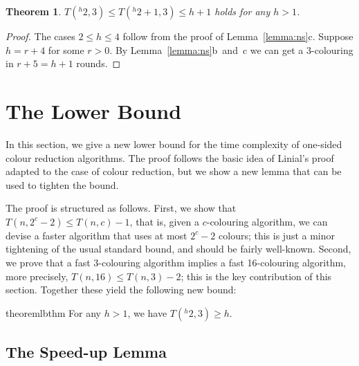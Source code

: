 \documentclass[a4paper,11pt]{article}
\newtheorem{theorem}{Theorem}
\theoremstyle{remark}
\newcommand{\pt}[1]{{}^{#1}2} \newcommand{\nh}{\sim} \DeclareMathOperator{\indeg}{in-deg}
\begin{document}
\begin{theorem}\label{thm:ub}
 $T(\pt{h},3) \le T(\pt{h}+1,3) \le h + 1$ holds for any $h > 1$.
\end{theorem}
\begin{proof}
The cases $2 \le h \le 4$ follow from the proof of Lemma~\ref{lemma:ns}c. Suppose $h = r + 4$ for some $r > 0$. By Lemma~\ref{lemma:ns}b~and~c we can get a 3-colouring in $r + 5 = h+1$ rounds.
\end{proof}

\section{The Lower Bound}\label{sec:lb}

In this section, we give a new lower bound for the time complexity of one-sided colour reduction algorithms. The proof follows the basic idea of Linial's proof~\cite{linial92locality} adapted to the case of colour reduction, but we show a new lemma that can be used to tighten the bound.

The proof is structured as follows. First, we show that $T(n, 2^c-2) \le T(n,c) - 1$, that is, given a $c$-colouring algorithm, we can devise a faster algorithm that uses at most $2^c-2$ colours; this is just a minor tightening of the usual standard bound, and should be fairly well-known. Second, we prove that a fast 3-colouring algorithm implies a fast 16-colouring algorithm, more precisely, $T(n,16) \le T(n,3)-2$; this is the key contribution of this section. Together these yield the following new bound:

\begin{restatable}{theorem}{lbthm}
\label{thm:lb}
 For any $h > 1$, we have $T(\pt{h}, 3) \ge h$.
\end{restatable}

\subsection{The Speed-up Lemma\label{sec:speedup}}
\end{document}
